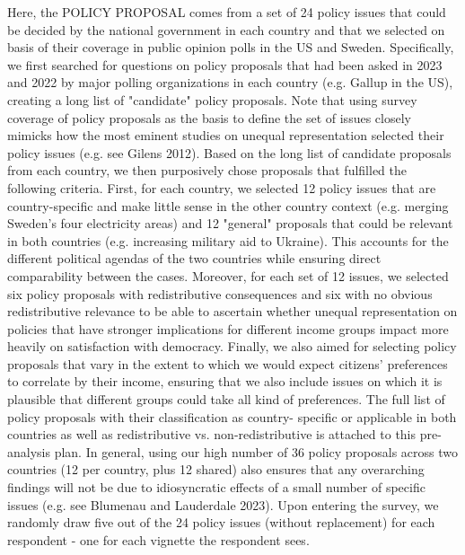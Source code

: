 \documentclass[12pt, letterpaper]{article}
\begin{document}
\begin{spacing}{1.5}
Here, the POLICY PROPOSAL comes from a set of 24 policy issues that could be decided by the national government in each country and that we selected on basis of their coverage in public opinion polls in the US and Sweden. Specifically, we first searched for questions on policy proposals that had been asked in 2023 and 2022 by major polling organizations in each country (e.g. Gallup in the US), creating a long list of "candidate" policy proposals. Note that using survey coverage of policy proposals as the basis to define the set of issues closely mimicks how the most eminent studies on unequal representation selected their policy issues (e.g. see Gilens 2012). Based on the long list of candidate proposals from each country, we then purposively chose proposals that fulfilled the following criteria. First, for each country, we selected 12 policy issues that are country-specific and make little sense in the other country context (e.g. merging Sweden's four electricity areas) and 12 "general" proposals that could be relevant in both countries (e.g. increasing military aid to Ukraine). This accounts for the different political agendas of the two countries while ensuring direct comparability between the cases. Moreover, for each set of 12 issues, we selected six policy proposals with redistributive consequences and six with no obvious redistributive relevance to be able to ascertain whether unequal representation on policies that have stronger implications for different income groups impact more heavily on satisfaction with democracy. Finally, we also aimed for selecting policy proposals that vary in the extent to which we would expect citizens' preferences to correlate by their income, ensuring that we also include issues on which it is plausible that different groups could take all kind of preferences. The full list of policy proposals with their classification as country- specific or applicable in both countries as well as redistributive vs. non-redistributive is attached to this pre-analysis plan. In general, using our high number of 36 policy proposals across two countries (12 per country, plus 12 shared) also ensures that any overarching findings will not be due to idiosyncratic effects of a small number of specific issues (e.g. see Blumenau and Lauderdale 2023). Upon entering the survey, we randomly draw five out of the 24 policy issues (without replacement) for each respondent - one for each vignette the respondent sees.


\end{spacing}
\end{document}
